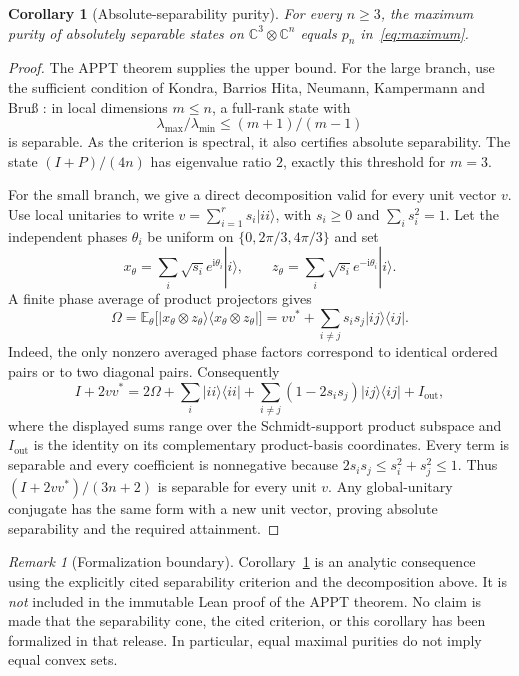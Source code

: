 \documentclass[11pt]{article}
\newtheorem{corollary}[theorem]{Corollary}
\theoremstyle{remark}\newtheorem{remark}[theorem]{Remark}
\newcommand{\C}{\mathbb C}
\begin{document}
\begin{corollary}[Absolute-separability purity]\label{cor:asep}
For every $n\geq3$, the maximum purity of absolutely separable states on $\C^3\otimes\C^n$ equals $p_n$ in~\eqref{eq:maximum}.
\end{corollary}
\begin{proof}
The APPT theorem supplies the upper bound. For the large branch, use the sufficient condition of Kondra, Barrios Hita, Neumann, Kampermann and Bru{\ss} \cite[Supplemental Material, Lemma 2]{Kondra}: in local dimensions $m\leq n$, a full-rank state with
\[
 \lambda_{\max}/\lambda_{\min}\leq(m+1)/(m-1)
\]
is separable. As the criterion is spectral, it also certifies absolute separability. The state $(I+P)/(4n)$ has eigenvalue ratio $2$, exactly this threshold for $m=3$.

For the small branch, we give a direct decomposition valid for every unit vector $v$. Use local unitaries to write $v=\sum_{i=1}^r s_i|ii\rangle$, with $s_i\geq0$ and $\sum_i s_i^2=1$. Let the independent phases $\theta_i$ be uniform on $\{0,2\pi/3,4\pi/3\}$ and set
\[
 x_\theta=\sum_i\sqrt{s_i}e^{\mathrm{i}\theta_i}|i\rangle,
 \qquad z_\theta=\sum_i\sqrt{s_i}e^{-\mathrm{i}\theta_i}|i\rangle.
\]
A finite phase average of product projectors gives
\[
 \Omega=\mathbb E_\theta\bigl[|x_\theta\otimes z_\theta\rangle
        \langle x_\theta\otimes z_\theta|\bigr]
 =vv^*+\sum_{i\ne j}s_i s_j|ij\rangle\langle ij|.
\]
Indeed, the only nonzero averaged phase factors correspond to identical ordered pairs or to two diagonal pairs. Consequently
\[
 I+2vv^*=2\Omega+\sum_i|ii\rangle\langle ii|
       +\sum_{i\ne j}(1-2s_i s_j)|ij\rangle\langle ij|+I_{\mathrm{out}},
\]
where the displayed sums range over the Schmidt-support product subspace and $I_{\mathrm{out}}$ is the identity on its complementary product-basis coordinates. Every term is separable and every coefficient is nonnegative because $2s_i s_j\leq s_i^2+s_j^2\leq1$. Thus $(I+2vv^*)/(3n+2)$ is separable for every unit $v$. Any global-unitary conjugate has the same form with a new unit vector, proving absolute separability and the required attainment.
\end{proof}

\begin{remark}[Formalization boundary]
Corollary~\ref{cor:asep} is an analytic consequence using the explicitly cited separability criterion and the decomposition above. It is \emph{not} included in the immutable Lean proof of the APPT theorem. No claim is made that the separability cone, the cited criterion, or this corollary has been formalized in that release. In particular, equal maximal purities do not imply equal convex sets.
\end{remark}
\end{document}
